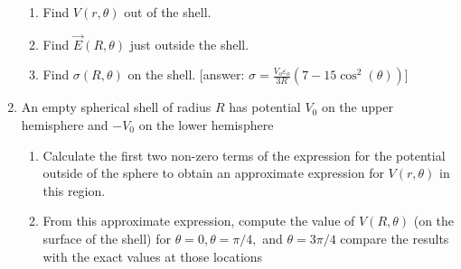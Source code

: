 \begin{enumerate}
\begin{enumerate}
      \item Find $V(r, \theta)$ out of the shell.

      \item Find $\vec{E}(R, \theta)$ just outside the shell.

      \item Find $\sigma(R, \theta)$ on the shell. [answer: $\sigma = \frac{V_o\varepsilon_o}{3R}(7 - 15\cos^2(\theta))$]

    \end{enumerate}

  \item An empty spherical shell of radius $R$ has potential $V_0$ on the upper hemisphere and $−V_0$ on the lower hemisphere

    \begin{enumerate}

      \item Calculate the first two non-zero terms of the expression for the potential outside of the sphere to obtain an approximate expression for $V(r, \theta)$ in this region.

      \item From this approximate expression, compute the value of $V(R, \theta)$ (on the surface of the shell) for $\theta = 0, \theta = \pi/4,$ and $\theta = 3\pi/4$ compare the results with the exact values at those locations

    \end{enumerate}

\end{enumerate}



